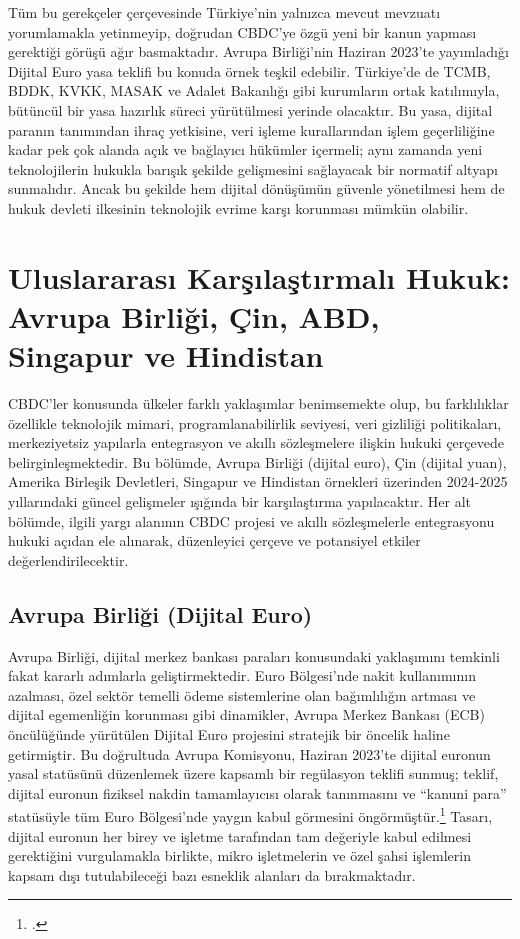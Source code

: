 \documentclass[a4paper,12pt]{article}
\begin{document}
Tüm bu gerekçeler çerçevesinde Türkiye’nin yalnızca mevcut mevzuatı yorumlamakla yetinmeyip, doğrudan CBDC’ye özgü yeni bir kanun yapması gerektiği görüşü ağır basmaktadır. Avrupa Birliği’nin Haziran 2023’te yayımladığı Dijital Euro yasa teklifi bu konuda örnek teşkil edebilir. Türkiye’de de TCMB, BDDK, KVKK, MASAK ve Adalet Bakanlığı gibi kurumların ortak katılımıyla, bütüncül bir yasa hazırlık süreci yürütülmesi yerinde olacaktır. Bu yasa, dijital paranın tanımından ihraç yetkisine, veri işleme kurallarından işlem geçerliliğine kadar pek çok alanda açık ve bağlayıcı hükümler içermeli; aynı zamanda yeni teknolojilerin hukukla barışık şekilde gelişmesini sağlayacak bir normatif altyapı sunmalıdır. Ancak bu şekilde hem dijital dönüşümün güvenle yönetilmesi hem de hukuk devleti ilkesinin teknolojik evrime karşı korunması mümkün olabilir.


\section{Uluslararası Karşılaştırmalı Hukuk: Avrupa Birliği, Çin, ABD, Singapur ve Hindistan}  

CBDC’ler konusunda ülkeler farklı yaklaşımlar benimsemekte olup, bu farklılıklar özellikle teknolojik mimari, programlanabilirlik seviyesi, veri gizliliği politikaları, merkeziyetsiz yapılarla entegrasyon ve akıllı sözleşmelere ilişkin hukuki çerçevede belirginleşmektedir. Bu bölümde, Avrupa Birliği (dijital euro), Çin (dijital yuan), Amerika Birleşik Devletleri, Singapur ve Hindistan örnekleri üzerinden 2024-2025 yıllarındaki güncel gelişmeler ışığında bir karşılaştırma yapılacaktır. Her alt bölümde, ilgili yargı alanının CBDC projesi ve akıllı sözleşmelerle entegrasyonu hukuki açıdan ele alınarak, düzenleyici çerçeve ve potansiyel etkiler değerlendirilecektir.

\subsection{Avrupa Birliği (Dijital Euro)}

Avrupa Birliği, dijital merkez bankası paraları konusundaki yaklaşımını temkinli fakat kararlı adımlarla geliştirmektedir. Euro Bölgesi’nde nakit kullanımının azalması, özel sektör temelli ödeme sistemlerine olan bağımlılığın artması ve dijital egemenliğin korunması gibi dinamikler, Avrupa Merkez Bankası (ECB) öncülüğünde yürütülen Dijital Euro projesini stratejik bir öncelik haline getirmiştir. Bu doğrultuda Avrupa Komisyonu, Haziran 2023’te dijital euronun yasal statüsünü düzenlemek üzere kapsamlı bir regülasyon teklifi sunmuş; teklif, dijital euronun fiziksel nakdin tamamlayıcısı olarak tanınmasını ve “kanuni para” statüsüyle tüm Euro Bölgesi’nde yaygın kabul görmesini öngörmüştür.\footcite{ecb2023digital} Tasarı, dijital euronun her birey ve işletme tarafından tam değeriyle kabul edilmesi gerektiğini vurgulamakla birlikte, mikro işletmelerin ve özel şahsi işlemlerin kapsam dışı tutulabileceği bazı esneklik alanları da bırakmaktadır.
\end{document}
